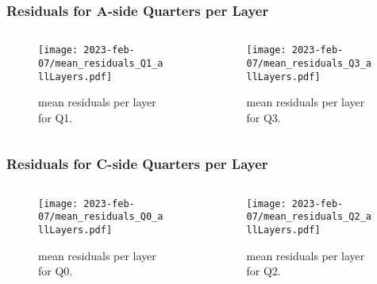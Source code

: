\documentclass[aspectratio=1610, 12pt]{beamer}
\begin{document}
%
\begin{frame}\frametitle{Residuals for A-side Quarters per Layer}
  \begin{columns}
    \begin{column}[c]{0.48\textwidth}
      \begin{figure}
        \centering
        \texttt{[image: 2023-feb-07/mean\_residuals\_Q1\_allLayers.pdf]}
        \caption{mean residuals per layer for Q1.}
      \end{figure}
    \end{column}
    \begin{column}[c]{0.48\textwidth}
      \begin{figure}
        \centering
        \texttt{[image: 2023-feb-07/mean\_residuals\_Q3\_allLayers.pdf]}
        \caption{mean residuals per layer for Q3.}
      \end{figure}
    \end{column}
  \end{columns}
\end{frame}
%
\begin{frame}\frametitle{Residuals for C-side Quarters per Layer}
  \begin{columns}
    \begin{column}[c]{0.48\textwidth}
      \begin{figure}
        \centering
        \texttt{[image: 2023-feb-07/mean\_residuals\_Q0\_allLayers.pdf]}
        \caption{mean residuals per layer for Q0.}
      \end{figure}
    \end{column}
    \begin{column}[c]{0.48\textwidth}
      \begin{figure}
        \centering
        \texttt{[image: 2023-feb-07/mean\_residuals\_Q2\_allLayers.pdf]}
        \caption{mean residuals per layer for Q2.}
      \end{figure}
    \end{column}
  \end{columns}
\end{frame}
\end{document}
